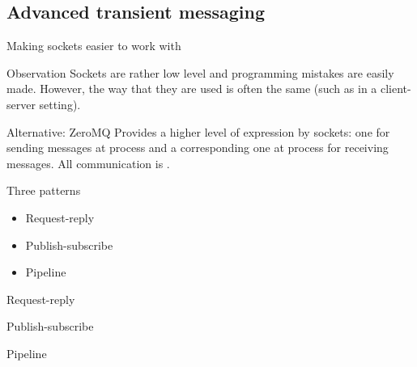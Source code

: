 \subsection{Advanced transient messaging}
\begin{slide}{Making sockets easier to work with}
  \begin{block}{Observation}
    Sockets are rather low level and programming mistakes are easily made. However, the way that they are used
    is often the same (such as in a client-server setting).
  \end{block}
  \begin{block}{Alternative: ZeroMQ}
    Provides a higher level of expression by  sockets: one for sending messages at process 
    and a corresponding one at process  for receiving messages. All communication is .
  \end{block}
  \begin{block}{Three patterns}
    \begin{itemize}\tightlist
    \item Request-reply
    \item Publish-subscribe
    \item Pipeline
    \end{itemize}
  \end{block}
\end{slide}
  \begin{slide}{Request-reply}
    \begin{centerfig}
    \end{centerfig}
  \end{slide}
  \begin{slide}{Publish-subscribe}
    \begin{centerfig}
    \end{centerfig}
  \end{slide}
  \begin{slide}{Pipeline}
    \begin{centerfig}
    \end{centerfig}
  \end{slide}
